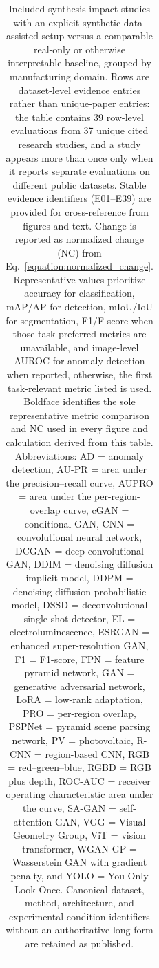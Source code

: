 \begingroup
\scriptsize
\setlength{\tabcolsep}{2pt}

\begin{longtable}{
    @{}
    p{}
    p{}
    p{}
    p{}
    p{}
    p{}
    p{}
    p{}
    p{}
    @{}
}
    \caption{Included synthesis-impact studies with an explicit synthetic-data-assisted setup versus a comparable real-only or otherwise interpretable baseline, grouped by manufacturing domain. Rows are dataset-level evidence entries rather than unique-paper entries: the table contains 39 row-level evaluations from 37 unique cited research studies, and a study appears more than once only when it reports separate evaluations on different public datasets. Stable evidence identifiers (E01--E39) are provided for cross-reference from figures and text. Change is reported as normalized change (NC) from Eq.~\ref{equation:normalized_change}. Representative values prioritize accuracy for classification, mAP/AP for detection, mIoU/IoU for segmentation, F1/F-score when those task-preferred metrics are unavailable, and image-level AUROC for anomaly detection when reported, otherwise, the first task-relevant metric listed is used. Boldface identifies the sole representative metric comparison and NC used in every figure and calculation derived from this table. Abbreviations: AD = anomaly detection, AU-PR = area under the precision--recall curve, AUPRO = area under the per-region-overlap curve, cGAN = conditional GAN, CNN = convolutional neural network, DCGAN = deep convolutional GAN, DDIM = denoising diffusion implicit model, DDPM = denoising diffusion probabilistic model, DSSD = deconvolutional single shot detector, EL = electroluminescence, ESRGAN = enhanced super-resolution GAN, F1 = F1-score, FPN = feature pyramid network, GAN = generative adversarial network, LoRA = low-rank adaptation, PRO = per-region overlap, PSPNet = pyramid scene parsing network, PV = photovoltaic, R-CNN = region-based CNN, RGB = red--green--blue, RGBD = RGB plus depth, ROC-AUC = receiver operating characteristic area under the curve, SA-GAN = self-attention GAN, VGG = Visual Geometry Group, ViT = vision transformer, WGAN-GP = Wasserstein GAN with gradient penalty, and YOLO = You Only Look Once. Canonical dataset, method, architecture, and experimental-condition identifiers without an authoritative long form are retained as published.}
    \label{tab:data_extraction}
    \label{tab:data_extraction_semiconductor}
    \label{tab:data_extraction_solar}
    \label{tab:data_extraction_metals}
    \label{tab:data_extraction_textiles}
    \label{tab:data_extraction_multindustry}\\


\end{longtable}

